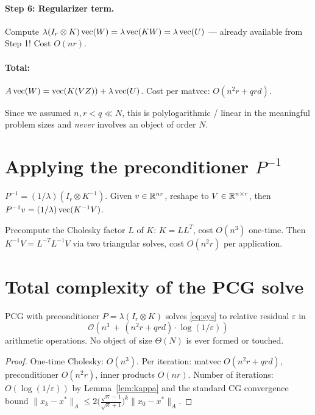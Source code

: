 \paragraph{Step 6: Regularizer term.} Compute $\lambda(I_r\otimes K)\operatorname{vec}(W) = \lambda\operatorname{vec}(KW) = \lambda\operatorname{vec}(U)$ --- already available from Step 1! Cost $O(nr)$.

\paragraph{Total:} $A\operatorname{vec}(W) = \operatorname{vec}(K(VZ)) + \lambda\operatorname{vec}(U)$. Cost per matvec: $O(n^2 r + qrd)$.

Since we assumed $n,r < q\ll N$, this is polylogarithmic / linear in the meaningful problem sizes and \emph{never} involves an object of order $N$.

\section{Applying the preconditioner $P^{-1}$}

$P^{-1} = (1/\lambda)(I_r\otimes K^{-1})$. Given $v\in\mathbb{R}^{nr}$, reshape to $V\in\mathbb{R}^{n\times r}$, then $P^{-1}v = (1/\lambda)\operatorname{vec}(K^{-1}V)$.

Precompute the Cholesky factor $L$ of $K$: $K=LL^T$, cost $O(n^3)$ one-time. Then $K^{-1}V = L^{-T}L^{-1}V$ via two triangular solves, cost $O(n^2 r)$ per application.

\section{Total complexity of the PCG solve}

\begin{proposition}[Complexity]\label{prop:cost}
PCG with preconditioner $P=\lambda(I_r\otimes K)$ solves \eqref{eq:sys} to relative residual $\varepsilon$ in
\[
   \mathcal O\!\left(n^3 \,+\, (n^2 r + qrd)\cdot\log(1/\varepsilon)\right)
\]
arithmetic operations. No object of size $\Theta(N)$ is ever formed or touched.
\end{proposition}

\begin{proof}
One-time Cholesky: $O(n^3)$. Per iteration: matvec $O(n^2 r + qrd)$, preconditioner $O(n^2 r)$, inner products $O(nr)$. Number of iterations: $O(\log(1/\varepsilon))$ by Lemma~\ref{lem:kappa} and the standard CG convergence bound $\|x_k-x^*\|_A\leq 2\bigl(\frac{\sqrt{\kappa}-1}{\sqrt{\kappa}+1}\bigr)^k\|x_0-x^*\|_A$.
\end{proof}

